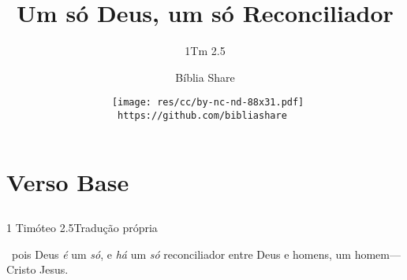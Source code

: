 \documentclass[12pt,aspectratio=169]{beamer}
\title{Um só Deus, um só Reconciliador}
\subtitle{1Tm 2.5}
\author{Bíblia Share}
\date[{\tiny\tt https://github.com/bibliashare}]{{\scriptsize\tt%
    \texttt{[image: res/cc/by-nc-nd-88x31.pdf]}\\[\smallskipamount]
    https://github.com/bibliashare
}}
\newcommand{\ver}[1]{%
    \raisebox{0.50ex}{%
        \scalebox{1.1}{%
            \pmb{\textbf{\textcolor{BSpbg}{#1}}}%
        }%
    }%
}
\newcommand{\QUOTE}[1]{%
    \par\noindent\hspace*{0.1\linewidth}%
    \begin{minipage}{0.8\linewidth}%
        \linespread{1.50}\large{#1}%
    \end{minipage}%
}
\begin{document}
    \begin{frame}
        \titlepage
    \end{frame}
    \section{Verso Base}
    \subsection{}

    \begin{frame}{1 Timóteo 2.5}{Tradução própria}
        \QUOTE{%
            \ver{5}~pois Deus {\it é} um {\it só\/}, e {\it há} um  {\it  só}  reconciliador
            entre Deus e homens, um homem---Cristo Jesus.
        }
    \end{frame}

\end{document}
